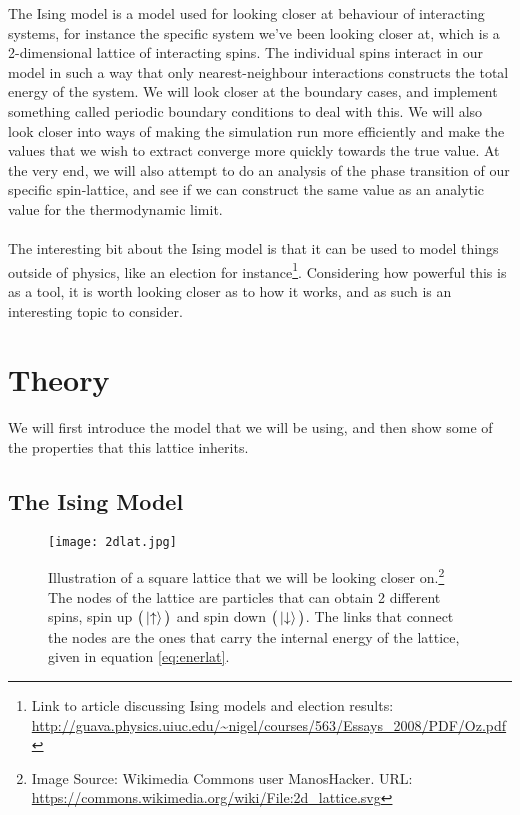 \documentclass[reprint,english,notitlepage]{revtex4-1}  %
\begin{document}
The Ising model is a model used for looking closer at behaviour of interacting systems, for instance the specific system we've been looking closer at, which is a 2-dimensional lattice of interacting spins. The individual spins interact in our model in such a way that only nearest-neighbour interactions constructs the total energy of the system. We will look closer at the boundary cases, and implement something called periodic boundary conditions to deal with this. We will also look closer into ways of making the simulation run more efficiently and make the values that we wish to extract converge more quickly towards the true value. At the very end, we will also attempt to do an analysis of the phase transition of our specific spin-lattice, and see if we can construct the same value as an analytic value for the thermodynamic limit.
\\
\\
The interesting bit about the Ising model is that it can be used to model things outside of physics, like an election for instance\footnote{Link to article discussing Ising models and election results: \url{http://guava.physics.uiuc.edu/~nigel/courses/563/Essays_2008/PDF/Oz.pdf}}. Considering how powerful this is as a tool, it is worth looking closer as to how it works, and as such is an interesting topic to consider.

\section{Theory}

We will first introduce the model that we will be using, and then show some of the properties that this lattice inherits.

\subsection{The Ising Model}

\begin{figure}[h!]
    \centering
    \texttt{[image: 2dlat.jpg]}
    \caption{Illustration of a square lattice that we will be looking closer on.\footnote{Image Source: Wikimedia Commons user ManosHacker. URL: \url{https://commons.wikimedia.org/wiki/File:2d_lattice.svg}} The nodes of the lattice are particles that can obtain 2 different spins, spin up $\big(\ket{\uparrow}\big)$ and spin down $\big(\ket{\downarrow}\big)$. The links that connect the nodes are the ones that carry the internal energy of the lattice, given in equation \ref{eq:enerlat}.}
    \label{fig:lattice}
\end{figure}
\end{document}
